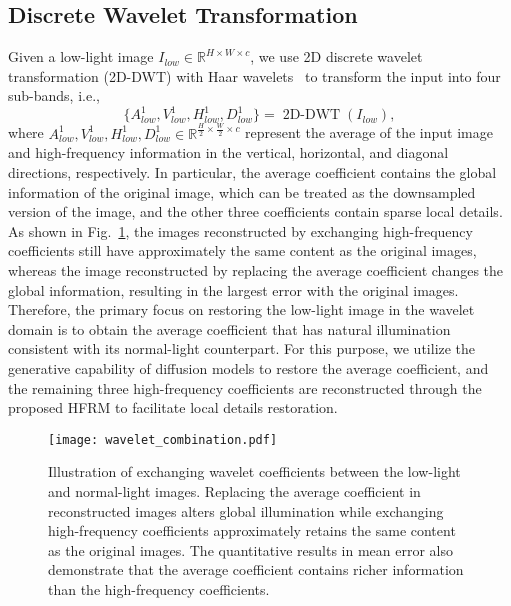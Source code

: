 \subsection{Discrete Wavelet Transformation}\label{subsec:Discrete Wavelet Transformation}
Given a low-light image $I_{low} \in \mathbb{R}^{H \times W \times c}$, we use 2D discrete wavelet transformation (2D-DWT) with Haar wavelets~\cite{haar} to transform the input into four sub-bands, i.e.,
\begin{equation}\label{eq:1}
	\{A_{low}^{1}, V_{low}^{1}, H_{low}^{1}, D_{low}^{1}\} = \operatorname{2D-DWT}(I_{low}),
\end{equation}
where $A_{low}^{1}, V_{low}^{1}, H_{low}^{1}, D_{low}^{1} \in \mathbb{R}^{\frac{H}{2} \times \frac{W}{2} \times c}$ represent the average of the input image and high-frequency information in the vertical, horizontal, and diagonal directions, respectively. In particular, the average coefficient contains the global information of the original image, which can be treated as the downsampled version of the image, and the other three coefficients contain sparse local details. As shown in Fig.~\ref{fig:Wavelet_combination}, the images reconstructed by exchanging high-frequency coefficients still have approximately the same content as the original images, whereas the image reconstructed by replacing the average coefficient changes the global information, resulting in the largest error with the original images. Therefore, the primary focus on restoring the low-light image in the wavelet domain is to obtain the average coefficient that has natural illumination consistent with its normal-light counterpart. For this purpose, we utilize the generative capability of diffusion models to restore the average coefficient, and the remaining three high-frequency coefficients are reconstructed through the proposed HFRM to facilitate local details restoration.
\begin{figure}[!t]
	\centering
	\texttt{[image: wavelet\_combination.pdf]}
	\caption{Illustration of exchanging wavelet coefficients between the low-light and normal-light images. Replacing the average coefficient in reconstructed images alters global illumination while exchanging high-frequency coefficients approximately retains the same content as the original images. The quantitative results in mean error also demonstrate that the average coefficient contains richer information than the high-frequency coefficients.}
	\label{fig:Wavelet_combination}
\end{figure}

